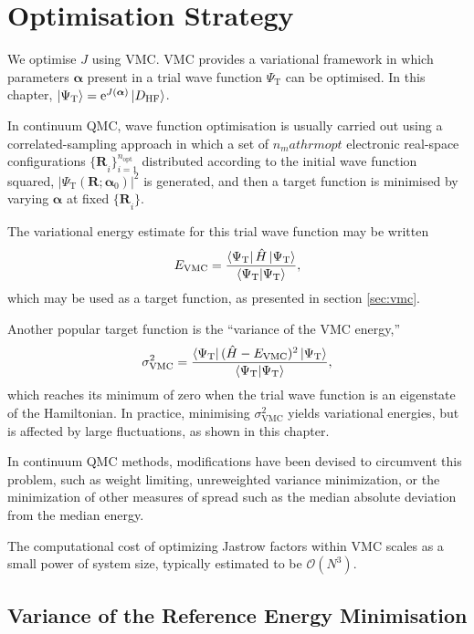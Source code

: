 \section{Optimisation Strategy}

We optimise $J$ using \gls{VMC}. VMC provides a variational framework in which parameters $\bm \alpha$ present in a trial wave function $\Psi_\mathrm{T}$ can be optimised. In this chapter, $\ket{\Psi_\mathrm{T}} = \mathrm{e}^{J(\bm\alpha)}\ket{D_\mathrm{HF}}$.

In continuum QMC, wave function optimisation is usually carried out using a correlated-sampling approach in which a set of $n_mathrm{opt}$ electronic real-space configurations ${\{\bm R}_{i}\}_{i=1}^{n_\mathrm{opt}}$ distributed according to the initial wave function squared, $|\Psi_\mathrm{T}({\bm R}; {\bm \alpha}_0)|^2$ is generated, and then a target function is minimised by varying $\bm\alpha$ at fixed ${\{\bm R}_{i}\}$.

The variational energy estimate for this trial wave function may be written
\begin{equation}
    E_\mathrm{VMC} = \frac{\bra{\Psi_\mathrm{T}} \hat H \ket{\Psi_\mathrm{T}} }{ \braket{\Psi_\mathrm{T}}{\Psi_\mathrm{T}} },
\end{equation}
which may be used as a target function, as presented in section \ref{sec:vmc}.

Another popular target function is the ``variance of the VMC energy,''\supercite{umrigarOptimized1988,kentMonte1999}
\begin{equation}
\sigma_\mathrm{VMC}^2 = \frac{\bra{\Psi_\mathrm{T}}(\hat H - E_\mathrm{VMC})^2\ket{\Psi_\mathrm{T}}}{\braket{\Psi_\mathrm{T}}},
\end{equation}
which reaches its minimum of zero when the trial wave function is an eigenstate of the Hamiltonian. In practice, minimising $\sigma_\mathrm{VMC}^2$ yields variational energies, but is affected by large fluctuations, as shown in this chapter.

In continuum QMC methods, modifications have been devised to
circumvent this problem, such as weight limiting, unreweighted
variance minimization, or the minimization of other measures of spread
such as the median absolute deviation from the median energy.\supercite{needsVariational2020}

The computational cost of optimizing Jastrow factors within VMC scales
as a small power of system size, typically estimated to be ${\mathcal
O}(N^3)$.

\subsection{Variance of the Reference Energy Minimisation}

